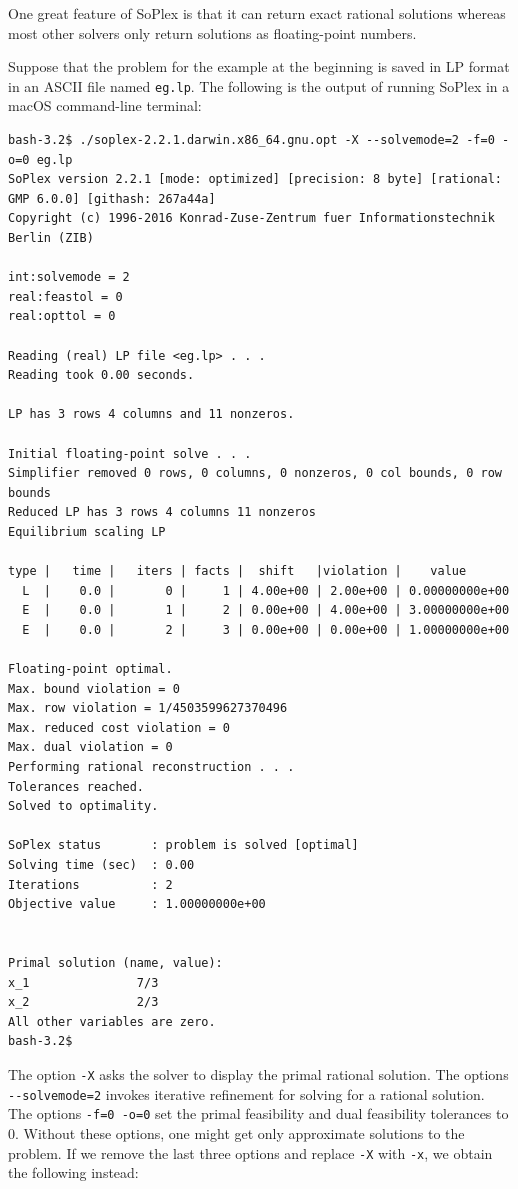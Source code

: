 \documentclass[]{book}
\theoremstyle{definition}
\theoremstyle{definition}
\theoremstyle{remark}
\begin{document}
One great feature of SoPlex is that it can return exact rational
solutions whereas most other solvers only return solutions as
floating-point numbers.

Suppose that the problem for the example at the beginning is saved in LP
format in an ASCII file named \texttt{eg.lp}. The following is the
output of running SoPlex in a macOS command-line terminal:

{\footnotesize
\begin{verbatim}
bash-3.2$ ./soplex-2.2.1.darwin.x86_64.gnu.opt -X --solvemode=2 -f=0 -o=0 eg.lp
SoPlex version 2.2.1 [mode: optimized] [precision: 8 byte] [rational: GMP 6.0.0] [githash: 267a44a]
Copyright (c) 1996-2016 Konrad-Zuse-Zentrum fuer Informationstechnik Berlin (ZIB)

int:solvemode = 2
real:feastol = 0
real:opttol = 0

Reading (real) LP file <eg.lp> . . .
Reading took 0.00 seconds.

LP has 3 rows 4 columns and 11 nonzeros.

Initial floating-point solve . . .
Simplifier removed 0 rows, 0 columns, 0 nonzeros, 0 col bounds, 0 row bounds
Reduced LP has 3 rows 4 columns 11 nonzeros
Equilibrium scaling LP

type |   time |   iters | facts |  shift   |violation |    value
  L  |    0.0 |       0 |     1 | 4.00e+00 | 2.00e+00 | 0.00000000e+00
  E  |    0.0 |       1 |     2 | 0.00e+00 | 4.00e+00 | 3.00000000e+00
  E  |    0.0 |       2 |     3 | 0.00e+00 | 0.00e+00 | 1.00000000e+00

Floating-point optimal.
Max. bound violation = 0
Max. row violation = 1/4503599627370496
Max. reduced cost violation = 0
Max. dual violation = 0
Performing rational reconstruction . . .
Tolerances reached.
Solved to optimality.

SoPlex status       : problem is solved [optimal]
Solving time (sec)  : 0.00
Iterations          : 2
Objective value     : 1.00000000e+00


Primal solution (name, value):
x_1               7/3
x_2               2/3
All other variables are zero.
bash-3.2$
\end{verbatim}
}

The option \texttt{-X} asks the solver to display the primal rational
solution. The options \texttt{-\/-solvemode=2} invokes iterative
refinement for solving for a rational solution. The options
\texttt{-f=0\ -o=0} set the primal feasibility and dual feasibility
tolerances to 0. Without these options, one might get only approximate
solutions to the problem. If we remove the last three options and
replace \texttt{-X} with \texttt{-x}, we obtain the following instead:
\end{document}
